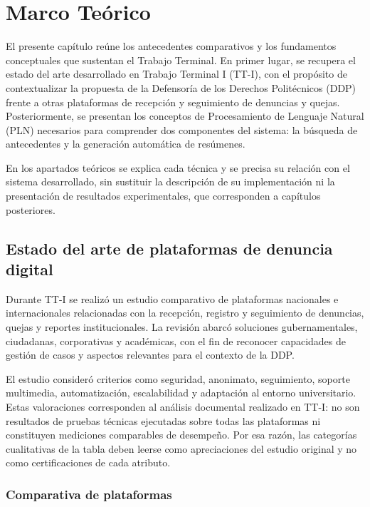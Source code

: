 \chapter{Marco Teórico}

El presente capítulo reúne los antecedentes comparativos y los fundamentos conceptuales que sustentan el Trabajo Terminal. En primer lugar, se recupera el estado del arte desarrollado en Trabajo Terminal I (TT-I), con el propósito de contextualizar la propuesta de la Defensoría de los Derechos Politécnicos (DDP) frente a otras plataformas de recepción y seguimiento de denuncias y quejas. Posteriormente, se presentan los conceptos de Procesamiento de Lenguaje Natural (PLN) necesarios para comprender dos componentes del sistema: la búsqueda de antecedentes y la generación automática de resúmenes.

En los apartados teóricos se explica cada técnica y se precisa su relación con el sistema desarrollado, sin sustituir la descripción de su implementación ni la presentación de resultados experimentales, que corresponden a capítulos posteriores.

\section{Estado del arte de plataformas de denuncia digital}
\label{sec:estado_arte_plataformas}

Durante TT-I se realizó un estudio comparativo de plataformas nacionales e internacionales relacionadas con la recepción, registro y seguimiento de denuncias, quejas y reportes institucionales. La revisión abarcó soluciones gubernamentales, ciudadanas, corporativas y académicas, con el fin de reconocer capacidades de gestión de casos y aspectos relevantes para el contexto de la DDP.

El estudio consideró criterios como seguridad, anonimato, seguimiento, soporte multimedia, automatización, escalabilidad y adaptación al entorno universitario. Estas valoraciones corresponden al análisis documental realizado en TT-I: no son resultados de pruebas técnicas ejecutadas sobre todas las plataformas ni constituyen mediciones comparables de desempeño. Por esa razón, las categorías cualitativas de la tabla deben leerse como apreciaciones del estudio original y no como certificaciones de cada atributo.

\subsection{Comparativa de plataformas}

